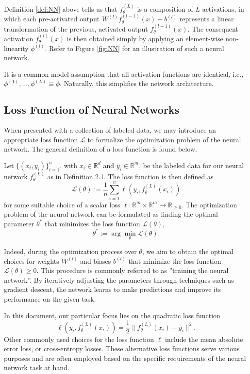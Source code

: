 \documentclass{article}
\begin{document}
\par
Definition \ref{def:NN} above tells us that $f_\theta^{(L)}$ is a composition of $L$ activations, in which each pre-activated output $W^{(l)}f_\theta^{(l-1)}(x)+b^{(l)}$ represents a linear transformation of the previous, activated output $f_\theta^{(l-1)}(x)$. The consequent activation $f_\theta^{(l)}(x)$ is then obtained simply by applying an element-wise non-linearity $\phi^{(l)}$. Refer to Figure \ref{fig:NN} for an illustration of such a neural network.
\par
It is a common model assumption that all activation functions are identical, i.e., $\phi^{(1)},\ldots,\phi^{(L)}\equiv\phi$. Naturally, this simplifies the network architecture.

\subsection{Loss Function of Neural Networks}
When presented with a collection of labeled data, we may introduce an appropriate loss function $\mathcal{L}$ to formalize the optimization problem of the neural network. The general definition of a loss function is found below.
\bigskip
\begin{definition}
Let $\{(x_i,y_i)\}_{i=1}^n$, with $x_i\in\mathbb{R}^d$ and $y_i\in\mathbb{R}^m$, be the labeled data for our neural network $f_\theta^{(L)}$ as in Definition 2.1. The loss function is then defined as
$$\mathcal{L}(\theta):=\frac{1}{n}\sum_{i=1}^n\ell(y_i,f_\theta^{(L)}(x_i))$$
for some suitable choice of a scalar loss $\ell:\mathbb{R}^m\times\mathbb{R}^m\to\mathbb{R}_{\geq0}$. The optimization problem of the neural network can be formulated as finding the optimal parameter $\theta^*$ that minimizes the loss function $\mathcal{L}(\theta)$,
$$\theta^*:=\arg\min_{\theta}\mathcal{L}(\theta).$$
\end{definition}
\smallskip
\par
Indeed, during the optimization process over $\theta$, we aim to obtain the optimal choices for weights $W^{(l)}$ and biases $b^{(l)}$ that minimize the loss function $\mathcal{L}(\theta)\geq 0$. This procedure is commonly referred to as ''training the neural network''. By iteratively adjusting the parameters through techniques such as gradient descent, the network learns to make predictions and improve its performance on the given task.
\par
In this document, our particular focus lies on the quadratic loss function
\begin{equation}
\ell(y_i,f_\theta^{(L)}(x_i))=\frac{1}{2}\|f_\theta^{(L)}(x_i)-y_i\|^2.
\end{equation}
Other commonly used choices for the loss function $\ell$ include the mean absolute error loss, or cross-entropy losses. These alternative loss functions serve various purposes and are often employed based on the specific requirements of the neural network task at hand.
\end{document}
